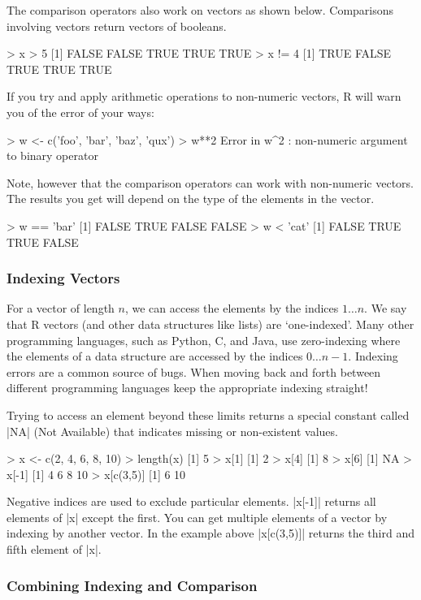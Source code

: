 The comparison operators also work on vectors as shown below.
Comparisons involving vectors return vectors of booleans.
%
\begin{R}
> x > 5
[1] FALSE FALSE  TRUE  TRUE  TRUE
> x != 4
[1]  TRUE FALSE  TRUE  TRUE  TRUE
\end{R}

If you try and apply arithmetic operations to non-numeric vectors, R will warn you of the error of your ways:
%
\begin{R}
> w <- c('foo', 'bar', 'baz', 'qux')
> w**2
Error in w^2 : non-numeric argument to binary operator
\end{R}
%
Note, however that the comparison operators can work with non-numeric vectors. The results you get will depend on the type of the elements in the vector.
%
\begin{R}
>  w == 'bar'
[1] FALSE  TRUE FALSE FALSE
> w < 'cat'
[1] FALSE  TRUE  TRUE FALSE
\end{R}


\subsubsection{Indexing Vectors}

For a vector of length $n$, we can access the elements by the indices $1
\ldots n$. We say that R vectors (and other data structures like lists) are `one-indexed'. Many other programming languages, such as Python, C, and Java, use zero-indexing where the elements of a data structure are accessed by the indices $0 \ldots n-1$. Indexing errors are a common source of bugs. When moving back and forth between different programming languages keep the appropriate indexing straight!

Trying to access an element beyond these limits returns a special
constant called |NA| (Not Available) that indicates missing or non-existent
values.
%
\begin{R}
> x <- c(2, 4, 6, 8, 10)
> length(x)
[1] 5
> x[1]
[1] 2
> x[4]
[1] 8
> x[6]
[1] NA
> x[-1]
[1]  4  6  8 10
> x[c(3,5)]
[1]  6 10
\end{R}
%
Negative indices are used to exclude particular elements. |x[-1]| returns all
elements of |x| except the first. You can get multiple elements of a vector by
indexing by another vector. In the example above |x[c(3,5)]| returns the third
and fifth element of |x|.

\subsubsection{Combining Indexing and Comparison}

